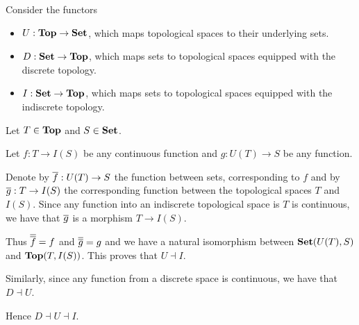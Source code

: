 \begin{example}\label{ex:top_adjoint_functor}\cite[example 2.1.5]{Leinster2014}
  Consider the functors
  \begin{itemize}
    \item $U: \operatorname{\mathbf{Top}} \to \operatorname{\mathbf{Set}}$, which maps topological spaces to their underlying sets.
    \item $D: \operatorname{\mathbf{Set}} \to \operatorname{\mathbf{Top}}$, which maps sets to topological spaces equipped with the discrete topology.
    \item $I: \operatorname{\mathbf{Set}} \to \operatorname{\mathbf{Top}}$, which maps sets to topological spaces equipped with the indiscrete topology.
  \end{itemize}

  Let $T \in \operatorname{\mathbf{Top}}$ and $S \in \operatorname{\mathbf{Set}}$.

  Let $f: T \to I(S)$ be any continuous function and $g: U(T) \to S$ be any function.

  Denote by $\overline{f}: U(T) \to S$ the function between sets, corresponding to $f$ and by $\overline{g}: T \to I(S)$ the corresponding function between the topological spaces $T$ and $I(S)$. Since any function into an indiscrete topological space is $T$ is continuous, we have that $\overline{g}$ is a morphism $T \to I(S)$.

  Thus $\overline{\overline{f}} = f$ and $\overline{\overline{g}} = g$ and we have a natural isomorphism between $\operatorname{\mathbf{Set}}(U(T), S)$ and $\operatorname{\mathbf{Top}}(T, I(S))$. This proves that $U \dashv I$.

  Similarly, since any function from a discrete space is continuous, we have that $D \dashv U$.

  Hence $D \dashv U \dashv I$.
\end{example}

